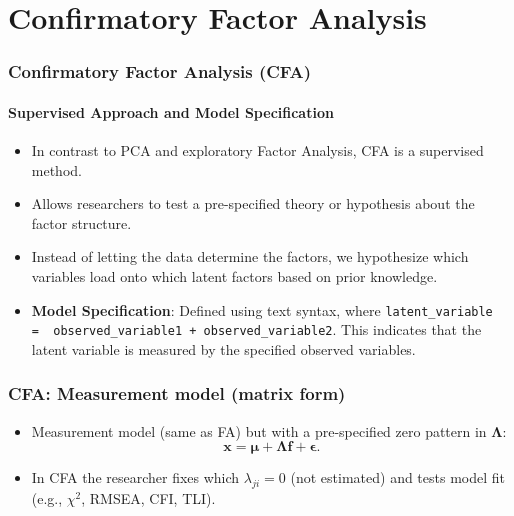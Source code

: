\documentclass{beamer}
\begin{document}
\section{Confirmatory Factor Analysis}

\begin{frame}
    \frametitle{Confirmatory Factor Analysis (CFA)}
    \framesubtitle{Supervised Approach and Model Specification}
    \begin{itemize}
        \item In contrast to PCA and exploratory Factor Analysis, CFA is a \alert{supervised} method.
        \item Allows researchers to \alert{test a pre-specified theory} or hypothesis about the factor structure.
        \item Instead of letting the data determine the factors, we hypothesize which variables load onto which latent factors based on prior knowledge.
    \item \textbf{Model Specification}: Defined using text syntax, where \texttt{latent\_variable =~ observed\_variable1 + observed\_variable2}. This indicates that the latent variable is measured by the specified observed variables.
    \end{itemize}
\end{frame}

\begin{frame}
    \frametitle{CFA: Measurement model (matrix form)}
    \begin{itemize}
        \item Measurement model (same as FA) but with a pre-specified zero pattern in $\mathbf{\Lambda}$:
        \[\mathbf{x}=\boldsymbol{\mu}+\mathbf{\Lambda}\mathbf{f}+\boldsymbol{\epsilon}.
        \]
        \item In CFA the researcher fixes which $\lambda_{ji}=0$ (not estimated) and tests model fit (e.g., $\chi^2$, RMSEA, CFI, TLI).
    \end{itemize}
\end{frame}
\end{document}
